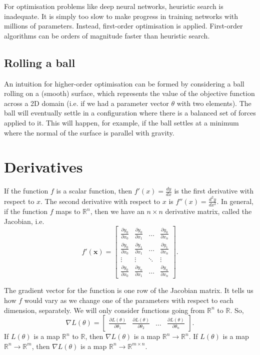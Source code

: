 \documentclass[a4paper, openany]{memoir}
\begin{document}
For optimisation problems like deep neural networks, heuristic search is inadequate. It is simply too slow to make progress in training networks with millions of parameters. Instead, first-order optimisation is applied. First-order algorithms can be orders of magnitude faster than heuristic search.

\subsection{Rolling a ball}
An intuition for higher-order optimisation can be formed by considering a ball rolling on a (smooth) surface, which represents the value of the objective function across a 2D domain (i.e. if we had a parameter vector $\theta$ with two elements). The ball will eventually settle in a configuration where there is a balanced set of forces applied to it. This will happen, for example, if the ball settles at a minimum where the normal of the surface is parallel with gravity.

\section{Derivatives}
If the function $f$ is a scalar function, then $f'(x) = \frac{dy}{dx}$ is the first derivative with respect to $x$. The second derivative with respect to $x$ is $f''(x) = \frac{d^2 y}{dx^2}$. In general, if the function $f$ maps to $\mathbb{R}^n$, then we have an $n \times n$ derivative matrix, called the Jacobian, i.e.
\[f'(\mathbf{x}) = \begin{bmatrix}
    \frac{\partial y_0}{\partial x_0} & \frac{\partial y_0}{\partial x_1} & \dots & \frac{\partial y_0}{\partial x_n} \\
    \frac{\partial y_0}{\partial x_0} & \frac{\partial y_1}{\partial x_1} & \dots & \frac{\partial y_1}{\partial x_n} \\
    \vdots & \vdots & \ddots & \vdots \\
    \frac{\partial y_0}{\partial x_0} & \frac{\partial y_n}{\partial x_1} & \dots & \frac{\partial y_n}{\partial x_n} 
\end{bmatrix}.\]

The gradient vector for the function is one row of the Jacobian matrix. It tells us how $f$ would vary as we change one of the parameters with respect to each dimension, separately. We will only consider functions going from $\mathbb{R}^n$ to $\mathbb{R}$. So,
\[\nabla L(\theta) = \begin{bmatrix}
    \frac{\partial L(\theta)}{\partial \theta_1} & \frac{\partial L(\theta)}{\partial \theta_2} & \dots & \frac{\partial L(\theta)}{\partial \theta_n} 
\end{bmatrix}.\]
If $L(\theta)$ is a map $\mathbb{R}^n$ to $\mathbb{R}$, then $\nabla L(\theta)$ is a map $\mathbb{R}^n \to \mathbb{R}^n$. If $L(\theta)$ is a map $\mathbb{R}^n \to \mathbb{R}^m$, then $\nabla L(\theta)$ is a map $\mathbb{R}^n \to \mathbb{R}^{m \times n}$.
\end{document}
